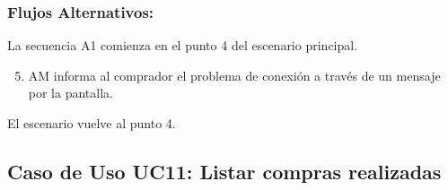 \begin{framed}
\subsubsection{Flujos Alternativos: }

La secuencia A1 comienza en el punto 4 del escenario principal.
\begin{enumerate}
    \setcounter{enumi}{4}
    \item AM informa al comprador el problema de conexión a través de un mensaje por la pantalla.
\end{enumerate}
El escenario vuelve al punto 4.

\end{framed}


\subsection{Caso de Uso UC11: Listar compras realizadas}

